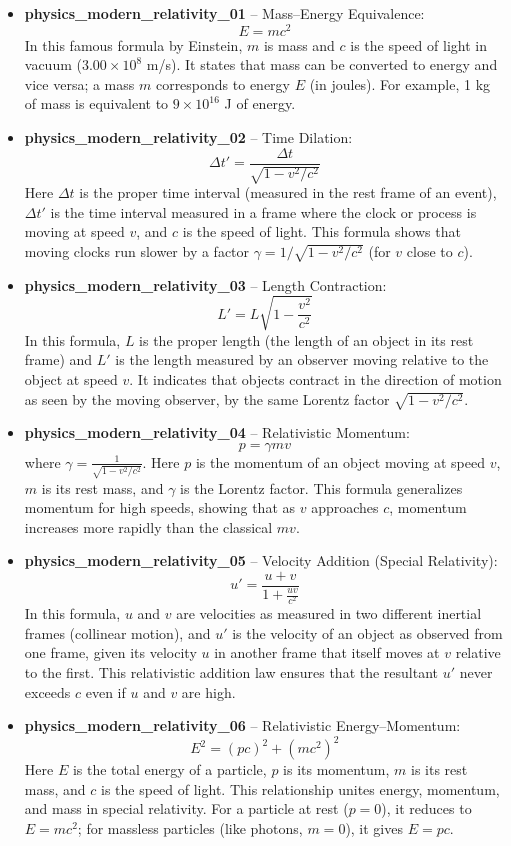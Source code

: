 \documentclass[11pt,a4paper]{article}
\begin{document}
\begin{itemize}
\item \textbf{physics\_modern\_relativity\_01} -- Mass--Energy Equivalence: 
\[E = mc^2\]
In this famous formula by Einstein, $m$ is mass and $c$ is the speed of light in vacuum ($3.00\times10^8$ m/s). It states that mass can be converted to energy and vice versa; a mass $m$ corresponds to energy $E$ (in joules). For example, 1 kg of mass is equivalent to $9\times10^{16}$ J of energy.

\item \textbf{physics\_modern\_relativity\_02} -- Time Dilation: 
\[\Delta t' = \frac{\Delta t}{\sqrt{1 - v^2/c^2}}\]
Here $\Delta t$ is the proper time interval (measured in the rest frame of an event), $\Delta t'$ is the time interval measured in a frame where the clock or process is moving at speed $v$, and $c$ is the speed of light. This formula shows that moving clocks run slower by a factor $\gamma = 1/\sqrt{1-v^2/c^2}$ (for $v$ close to $c$).

\item \textbf{physics\_modern\_relativity\_03} -- Length Contraction: 
\[L' = L\sqrt{1 - \frac{v^2}{c^2}}\]
In this formula, $L$ is the proper length (the length of an object in its rest frame) and $L'$ is the length measured by an observer moving relative to the object at speed $v$. It indicates that objects contract in the direction of motion as seen by the moving observer, by the same Lorentz factor $\sqrt{1-v^2/c^2}$.

\item \textbf{physics\_modern\_relativity\_04} -- Relativistic Momentum: 
\[p = \gamma m v\]
where $\gamma = \frac{1}{\sqrt{1 - v^2/c^2}}$. Here $p$ is the momentum of an object moving at speed $v$, $m$ is its rest mass, and $\gamma$ is the Lorentz factor. This formula generalizes momentum for high speeds, showing that as $v$ approaches $c$, momentum increases more rapidly than the classical $mv$.

\item \textbf{physics\_modern\_relativity\_05} -- Velocity Addition (Special Relativity): 
\[u' = \frac{u + v}{1 + \frac{uv}{c^2}}\]
In this formula, $u$ and $v$ are velocities as measured in two different inertial frames (collinear motion), and $u'$ is the velocity of an object as observed from one frame, given its velocity $u$ in another frame that itself moves at $v$ relative to the first. This relativistic addition law ensures that the resultant $u'$ never exceeds $c$ even if $u$ and $v$ are high.

\item \textbf{physics\_modern\_relativity\_06} -- Relativistic Energy--Momentum: 
\[E^2 = (pc)^2 + (mc^2)^2\]
Here $E$ is the total energy of a particle, $p$ is its momentum, $m$ is its rest mass, and $c$ is the speed of light. This relationship unites energy, momentum, and mass in special relativity. For a particle at rest ($p=0$), it reduces to $E = mc^2$; for massless particles (like photons, $m=0$), it gives $E = pc$.
\end{itemize}
\end{document}
